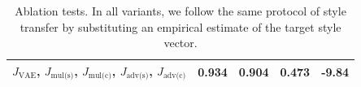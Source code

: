 \documentclass[letterpaper]{article} %
\newcommand{\loss}[1]{J_{\text{#1}}}
\begin{document}
\begin{table}[ht]
\begin{tabular}{| l || c | c | c | c |}
		\hline
		$\loss{VAE}$, $\loss{mul(s)}$, $\loss{mul(c)}$, $\loss{adv(s)}$, $\loss{adv(c)}$ & \textbf{0.934}  & 0.904             & \textbf{0.473} & \textbf{-9.84}  \\
		\hline
	\end{tabular}
	\caption{Ablation tests. In all variants, we follow the same protocol of style transfer by substituting an empirical estimate of the target style vector.}
	\label{tab:ablation-results}
\end{table}
\end{document}
